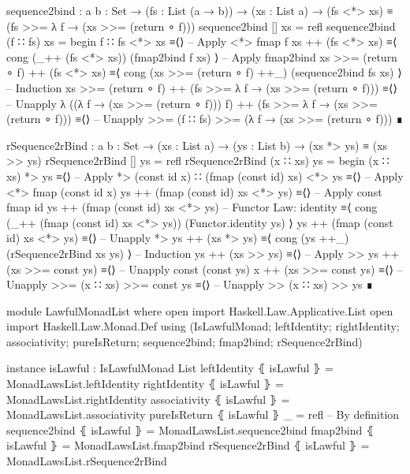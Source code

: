 \documentclass{article}
\begin{document}
\begin{code}
  sequence2bind : {a b : Set}
    → (fs : List (a → b)) → (xs : List a)
    → (fs <*> xs) ≡ (fs >>= λ f → (xs >>= (return ∘ f)))
  sequence2bind [] xs = refl
  sequence2bind (f ∷ fs) xs =
    begin
      f ∷ fs <*> xs
    ≡⟨⟩ -- Apply <*>
      fmap f xs ++ (fs <*> xs)
    ≡⟨ cong (_++ (fs <*> xs)) (fmap2bind f xs) ⟩ -- Apply fmap2bind
      xs >>= (return ∘ f) ++ (fs <*> xs)
    ≡⟨ cong (xs >>= (return ∘ f) ++_) (sequence2bind fs xs) ⟩  -- Induction
      xs >>= (return ∘ f)
        ++ (fs >>= λ f → (xs >>= (return ∘ f)))
    ≡⟨⟩ -- Unapply λ
      ((λ f → (xs >>= (return ∘ f))) f)
        ++ (fs >>= λ f → (xs >>= (return ∘ f)))
    ≡⟨⟩ -- Unapply >>=
      (f ∷ fs) >>= (λ f → (xs >>= (return ∘ f)))
    ∎
\end{code}
\begin{code}
  rSequence2rBind : {a b : Set} → (xs : List a) → (ys : List b)
    → (xs *> ys) ≡ (xs >> ys)
  rSequence2rBind [] ys = refl
  rSequence2rBind (x ∷ xs) ys =
    begin
      (x ∷ xs) *> ys
    ≡⟨⟩ -- Apply *>
      (const id x) ∷ (fmap (const id) xs) <*> ys
    ≡⟨⟩ -- Apply <*>
      fmap (const id x) ys ++ (fmap (const id) xs <*> ys)
    ≡⟨⟩ -- Apply const
      fmap id ys ++ (fmap (const id) xs <*> ys)
    -- Functor Law: identity
    ≡⟨ cong (_++ (fmap (const id) xs <*> ys)) (Functor.identity ys) ⟩
      ys ++ (fmap (const id) xs <*> ys)
    ≡⟨⟩ -- Unapply *>
      ys ++ (xs *> ys)
    ≡⟨ cong (ys ++_) (rSequence2rBind xs ys) ⟩ -- Induction
      ys ++ (xs >> ys)
    ≡⟨⟩ -- Apply >>
      ys ++ (xs >>= const ys)
    ≡⟨⟩ -- Unapply const
      (const ys) x ++ (xs >>= const ys)
    ≡⟨⟩ -- Unapply >>=
      (x ∷ xs) >>= const ys
    ≡⟨⟩ -- Unapply >>
      (x ∷ xs) >> ys
    ∎
\end{code}
\begin{code}
module LawfulMonadList where
  open import Haskell.Law.Applicative.List
  open import Haskell.Law.Monad.Def
    using (IsLawfulMonad; leftIdentity; rightIdentity;
      associativity; pureIsReturn; sequence2bind; fmap2bind;
      rSequence2rBind)
\end{code}
\begin{code}
  instance
    isLawful : IsLawfulMonad List
    leftIdentity ⦃ isLawful ⦄ = MonadLawsList.leftIdentity
    rightIdentity ⦃ isLawful ⦄ = MonadLawsList.rightIdentity
    associativity ⦃ isLawful ⦄ = MonadLawsList.associativity
    pureIsReturn ⦃ isLawful ⦄ _ = refl -- By definition
    sequence2bind ⦃ isLawful ⦄ = MonadLawsList.sequence2bind
    fmap2bind ⦃ isLawful ⦄ = MonadLawsList.fmap2bind
    rSequence2rBind ⦃ isLawful ⦄ = MonadLawsList.rSequence2rBind
\end{code}
\end{document}

